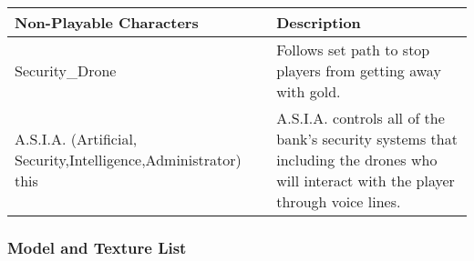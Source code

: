 \documentclass[10pt]{report}
\begin{document}
\begin{center}
    \begin{tabular}{| p{.45\linewidth} | p{.45\linewidth} |}
        \hline    
        Non-Playable Characters &   Description  \\ \hline
        Security\_Drone &    Follows set path to stop players from getting away with gold.  \\ \hline
        A.S.I.A. (Artificial, Security,Intelligence,Administrator) this &   A.S.I.A. controls all of the bank’s security systems that including the drones who will interact with the player through voice lines.  \\
        \hline
    \end{tabular}
\end{center}

\subsubsection{Model and Texture List}
\end{document}
